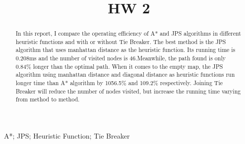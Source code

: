 \documentclass[conference]{IEEEtran}
\begin{document}
\title{HW 2\\
}

\author{
}

\maketitle

\begin{abstract}
	In this report, I compare the operating efficiency of A* and JPS algorithms in different heuristic functions and with or without Tie Breaker. The best method is the JPS algorithm that uses manhattan distance as the heuristic function. Its running time is 0.208ms and the number of visited nodes is 46.Meanwhile, the path found is only 0.84\% longer than the optimal path. When it comes to the empty map, the JPS algorithm using manhattan distance and diagonal distance as heuristic functions run longer time than A* algorithm by 1056.5\% and 109.2\% respectively. Joining Tie Breaker will reduce the number of nodes visited, but increase the running time varying from method to method.
\end{abstract}

\begin{IEEEkeywords}
A*; JPS; Heuristic Function; Tie Breaker
\end{IEEEkeywords}

\end{document}

